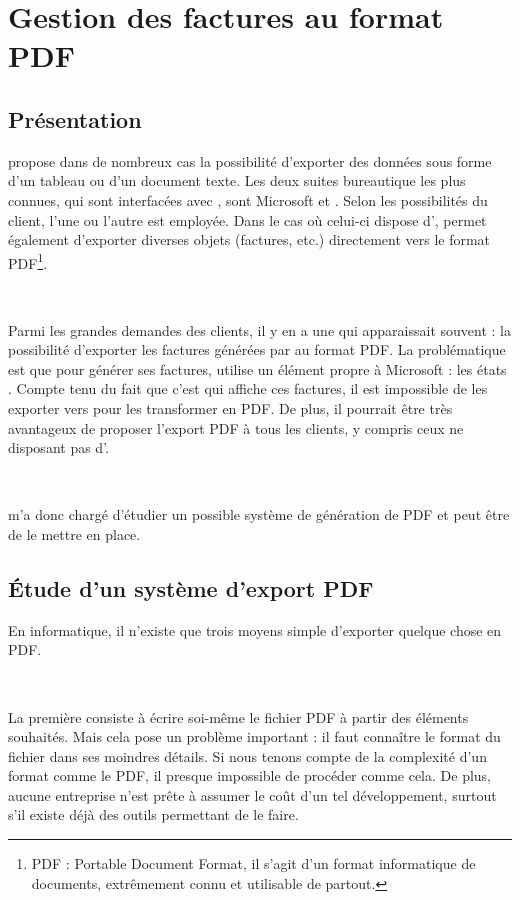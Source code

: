 \chapter{Gestion des factures au format PDF}
\section{Présentation}
\integrale{} propose dans de nombreux cas la possibilité d'exporter des données sous forme d'un tableau ou d'un document texte. Les deux suites bureautique les plus connues, qui sont interfacées avec \integrale, sont Microsoft  et . Selon les possibilités du client, l'une ou l'autre est employée. Dans le cas où celui-ci dispose d', \integrale{} permet également d'exporter diverses objets (factures, etc.) directement vers le format PDF\footnote{PDF : Portable Document Format, il s'agit d'un format informatique de documents, extrêmement connu et utilisable de partout.}.

~

Parmi les grandes demandes des clients, il y en a une qui apparaissait souvent : la possibilité d'exporter les factures générées par \integrale{} au format PDF. La problématique est que pour générer ses factures, \solulog{} utilise un élément propre à Microsoft  : les \og états \fg. Compte tenu du fait que c'est  qui affiche ces factures, il est impossible de les exporter vers  pour les transformer en PDF. De plus, il pourrait être très avantageux de proposer l'export PDF à tous les clients, y compris ceux ne disposant pas d'.

~

\solulog{} m'a donc chargé d'étudier un possible système de génération de PDF et peut être de le mettre en place.

\section{Étude d'un système d'export PDF}
En informatique, il n'existe que trois moyens \og simple \fg{} d'exporter quelque chose en PDF.

~

La première consiste à écrire soi-même le fichier PDF à partir des éléments souhaités. Mais cela pose un problème important : il faut connaître le format du fichier dans ses moindres détails. Si nous tenons compte de la complexité d'un format comme le PDF, il presque impossible de procéder comme cela. De plus, aucune entreprise n'est prête à assumer le coût d'un tel développement, surtout s'il existe déjà des outils permettant de le faire.

